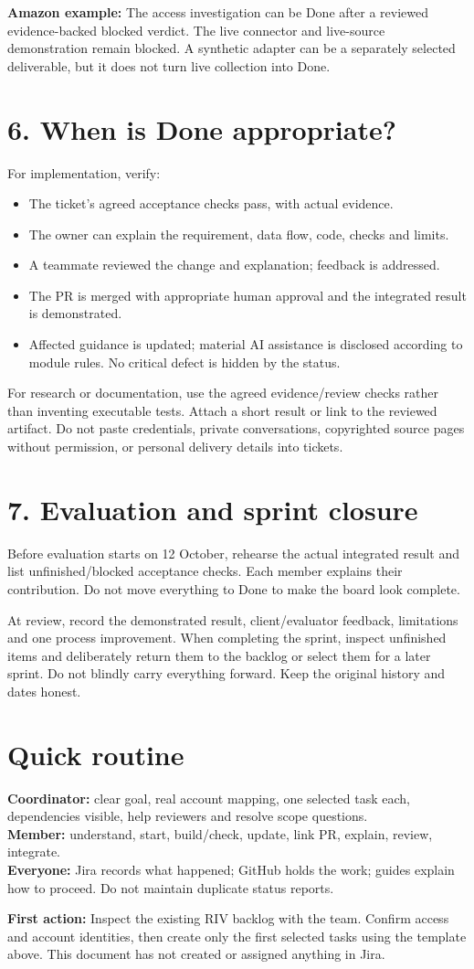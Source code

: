 \textbf{Amazon example:} The access investigation can be Done after a reviewed evidence-backed blocked verdict. The live connector and live-source demonstration remain blocked. A synthetic adapter can be a separately selected deliverable, but it does not turn live collection into Done.

\section*{6. When is Done appropriate?}
For implementation, verify:
\begin{itemize}
\item The ticket's agreed acceptance checks pass, with actual evidence.
\item The owner can explain the requirement, data flow, code, checks and limits.
\item A teammate reviewed the change and explanation; feedback is addressed.
\item The PR is merged with appropriate human approval and the integrated result is demonstrated.
\item Affected guidance is updated; material AI assistance is disclosed according to module rules. No critical defect is hidden by the status.
\end{itemize}
For research or documentation, use the agreed evidence/review checks rather than inventing executable tests. Attach a short result or link to the reviewed artifact. Do not paste credentials, private conversations, copyrighted source pages without permission, or personal delivery details into tickets.

\section*{7. Evaluation and sprint closure}
Before evaluation starts on 12 October, rehearse the actual integrated result and list unfinished/blocked acceptance checks. Each member explains their contribution. Do not move everything to Done to make the board look complete.

At review, record the demonstrated result, client/evaluator feedback, limitations and one process improvement. When completing the sprint, inspect unfinished items and deliberately return them to the backlog or select them for a later sprint. Do not blindly carry everything forward. Keep the original history and dates honest.

\section*{Quick routine}
\textbf{Coordinator:} clear goal, real account mapping, one selected task each, dependencies visible, help reviewers and resolve scope questions.\\
\textbf{Member:} understand, start, build/check, update, link PR, explain, review, integrate.\\
\textbf{Everyone:} Jira records what happened; GitHub holds the work; guides explain how to proceed. Do not maintain duplicate status reports.

\textbf{First action:} Inspect the existing RIV backlog with the team. Confirm access and account identities, then create only the first selected tasks using the template above. This document has not created or assigned anything in Jira.

